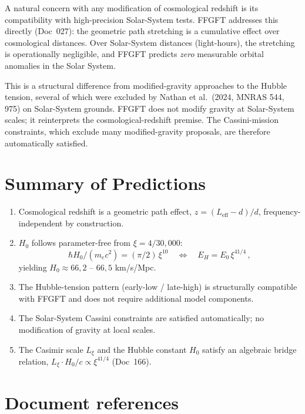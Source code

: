 \documentclass[11pt,a4paper]{article}
\begin{document}
A natural concern with any modification of cosmological redshift is its compatibility with high-precision Solar-System tests. FFGFT addresses this directly (Doc~027): the geometric path stretching is a cumulative effect over cosmological distances. Over Solar-System distances (light-hours), the stretching is operationally negligible, and FFGFT predicts \emph{zero} measurable orbital anomalies in the Solar System.

This is a structural difference from modified-gravity approaches to the Hubble tension, several of which were excluded by Nathan et al.~(2024, MNRAS 544, 975) on Solar-System grounds. FFGFT does not modify gravity at Solar-System scales; it reinterprets the cosmological-redshift premise. The Cassini-mission constraints, which exclude many modified-gravity proposals, are therefore automatically satisfied.

\section{Summary of Predictions}

\begin{enumerate}\itemsep2pt
\item Cosmological redshift is a geometric path effect, $z = (L_{\mathrm{eff}}-d)/d$, frequency-independent by construction.
\item $H_0$ follows parameter-free from $\xi = 4/30{,}000$:
\[
\hbar H_0 / (m_e c^2) = (\pi/2)\,\xi^{10} \quad\Longleftrightarrow\quad E_H = E_0\,\xi^{41/4}\,,
\]
yielding $H_0 \approx 66{,}2$ -- $66{,}5$ km/s/Mpc.
\item The Hubble-tension pattern (early-low / late-high) is structurally compatible with FFGFT and does not require additional model components.
\item The Solar-System Cassini constraints are satisfied automatically; no modification of gravity at local scales.
\item The Casimir scale $L_\xi$ and the Hubble constant $H_0$ satisfy an algebraic bridge relation, $L_\xi \cdot H_0/c \propto \xi^{41/4}$ (Doc~166).
\end{enumerate}

\section*{Document references}
\end{document}
